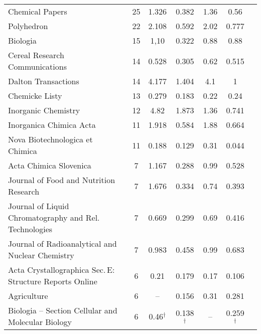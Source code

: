 {\begin{longtable}[c]{lcccccc}
  Chemical Papers                                          & 25 & 1.326         & 0.382          & 1.36 & 0.56          \\
  Polyhedron                                               & 22 & 2.108         & 0.592          & 2.02 & 0.777         \\
  Biologia                                                 & 15 & 1,10          & 0.322          & 0.88 & 0.88          \\
  Cereal Research Communications                           & 14 & 0.528         & 0.305          & 0.62 & 0.515         \\
  Dalton Transactions                                      & 14 & 4.177         & 1.404          & 4.1  & 1             \\[1ex]
  Chemicke Listy                                           & 13 & 0.279         & 0.183          & 0.22 & 0.24          \\
  Inorganic Chemistry                                      & 12 & 4.82          & 1.873          & 1.36 & 0.741         \\
  Inorganica Chimica Acta                                  & 11 & 1.918         & 0.584          & 1.88 & 0.664         \\
  Nova Biotechnologica et Chimica                          & 11 & 0.188         & 0.129          & 0.31 & 0.044         \\
  Acta Chimica Slovenica                                   & 7  & 1.167         & 0.288          & 0.99 & 0.528         \\[1ex]
  Journal of Food and Nutrition Research                   & 7  & 1.676         & 0.334          & 0.74 & 0.393         \\
  Journal of Liquid Chromatography and Rel.\,Technologies  & 7  & 0.669         & 0.299          & 0.69 & 0.416         \\
  Journal of Radioanalytical and Nuclear Chemistry         & 7  & 0.983         & 0.458          & 0.99 & 0.683         \\
  Acta Crystallographica Sec.\,E: Structure Reports Online & 6  & 0.21          & 0.179          & 0.17 & 0.106         \\
  Agriculture                                              & 6  & --            & 0.156          & 0.31 & 0.281         \\[1ex]
  Biologia -- Section Cellular and Molecular Biology       & 6  & 0.46$^\dagger$ & 0.138 $^\dagger$ &  --  & 0.259$^\dagger$ \\

\end{longtable}}
